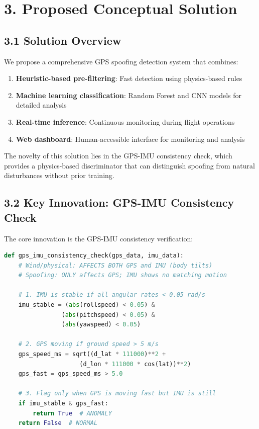 \section{3. Proposed Conceptual Solution}

\subsection{3.1 Solution Overview}

We propose a comprehensive GPS spoofing detection system that combines:

\begin{enumerate}
    \item \textbf{Heuristic-based pre-filtering}: Fast detection using physics-based rules
    \item \textbf{Machine learning classification}: Random Forest and CNN models for detailed analysis
    \item \textbf{Real-time inference}: Continuous monitoring during flight operations
    \item \textbf{Web dashboard}: Human-accessible interface for monitoring and analysis
\end{enumerate}

The novelty of this solution lies in the GPS-IMU consistency check, which provides a physics-based discriminator that can distinguish spoofing from natural disturbances without prior training.

\subsection{3.2 Key Innovation: GPS-IMU Consistency Check}

The core innovation is the GPS-IMU consistency verification:

\begin{lstlisting}[language=python, style=pythonstyle]
def gps_imu_consistency_check(gps_data, imu_data):
    # Wind/physical: AFFECTS BOTH GPS and IMU (body tilts)
    # Spoofing: ONLY affects GPS; IMU shows no matching motion
    
    # 1. IMU is stable if all angular rates < 0.05 rad/s
    imu_stable = (abs(rollspeed) < 0.05) & 
                (abs(pitchspeed) < 0.05) & 
                (abs(yawspeed) < 0.05)
    
    # 2. GPS moving if ground speed > 5 m/s
    gps_speed_ms = sqrt((d_lat * 111000)**2 + 
                     (d_lon * 111000 * cos(lat))**2)
    gps_fast = gps_speed_ms > 5.0
    
    # 3. Flag only when GPS is moving fast but IMU is still
    if imu_stable & gps_fast:
        return True  # ANOMALY
    return False  # NORMAL
\end{lstlisting}

